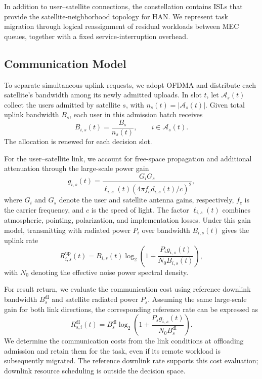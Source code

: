 \documentclass[journal]{IEEEtran}
\begin{document}
In addition to user--satellite connections, the constellation
contains ISLs that provide the satellite-neighborhood
topology for HAN. We represent task migration through
logical reassignment of residual workloads between MEC
queues, together with a fixed service-interruption overhead.

\subsection{Communication Model}
\label{subsec:communication_model}

To separate simultaneous uplink requests, we adopt OFDMA
and distribute each satellite's bandwidth among its newly
admitted uploads. In slot $t$, let $\mathcal{A}_s(t)$
collect the users admitted by satellite $s$, with
$n_s(t)=|\mathcal{A}_s(t)|$. Given total uplink bandwidth
$B_s$, each user in this admission batch receives
\begin{equation}
B_{i,s}(t)=\frac{B_s}{n_s(t)},
\qquad i\in\mathcal{A}_s(t).
\label{eq:bandwidth_sharing}
\end{equation}
The allocation is renewed for each decision slot.

For the user--satellite link, we account for free-space
propagation and additional attenuation through the
large-scale power gain
\begin{equation}
g_{i,s}(t)=
\frac{G_iG_s}
{\ell_{i,s}(t)
 \left(4\pi f_c d_{i,s}(t)/c\right)^2},
\label{eq:channel_gain}
\end{equation}
where $G_i$ and $G_s$ denote the user and satellite
antenna gains, respectively, $f_c$ is the carrier frequency,
and $c$ is the speed of light. The factor $\ell_{i,s}(t)$
combines atmospheric, pointing, polarization, and
implementation losses. Under this gain model, transmitting
with radiated power $P_i$ over bandwidth $B_{i,s}(t)$
gives the uplink rate
\begin{equation}
R^{\mathrm{up}}_{i,s}(t)=
B_{i,s}(t)
\log_2\left(
1+\frac{P_i g_{i,s}(t)}
{N_0B_{i,s}(t)}
\right),
\label{eq:uplink_rate}
\end{equation}
with $N_0$ denoting the effective noise power spectral
density.

For result return, we evaluate the communication cost
using reference downlink bandwidth $B_s^{\mathrm{dl}}$
and satellite radiated power $P_s$. Assuming the same
large-scale gain for both link directions, the corresponding
reference rate can be expressed as
\begin{equation}
R^{\mathrm{dl}}_{s,i}(t)=
B_s^{\mathrm{dl}}
\log_2\left(
1+\frac{P_s g_{i,s}(t)}
{N_0B_s^{\mathrm{dl}}}
\right).
\label{eq:downlink_rate}
\end{equation}
We determine the communication costs from the link
conditions at offloading admission and retain them for
the task, even if its remote workload is subsequently
migrated. The reference downlink rate supports this
cost evaluation; downlink resource scheduling is outside
the decision space.
\end{document}
